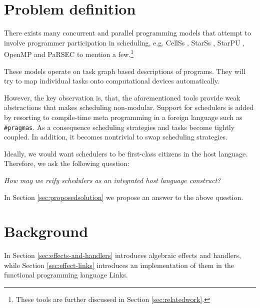 \documentclass[preprint,10pt,numbers]{sigplanconf}
\begin{document}

  \section{Problem definition}\label{sec:problemdefinition}
There exists many concurrent and parallel programming models that attempt to involve programmer participation in scheduling, e.g. CellSs \cite{Bellens2009}, StarSs \cite{Planas2009}, StarPU \cite{Augonnet2011}, OpenMP \cite{Openmp2013} and PaRSEC \cite{Bosilca2013} to mention a few.\footnote{These tools are further discussed in Section \ref{sec:relatedwork}.}

These models operate on task graph based descriptions of programs. They will try to map individual tasks onto computational devices automatically.

However, the key observation is, that, the aforementioned tools provide weak abstractions that makes scheduling non-modular. Support for schedulers is added by resorting to compile-time meta programming in a foreign language such as \texttt{\#pragmas}. As a consequence scheduling strategies and tasks become tightly coupled. In addition, it becomes nontrivial to swap scheduling strategies.

Ideally, we would want schedulers to be first-class citizens in the host language. Therefore, we ask the following question:
\begin{center}
  \emph{How may we reify schedulers as an integrated host language construct?}
\end{center}
In Section \ref{sec:proposedsolution} we propose an answer to the above question.

\section{Background}\label{sec:background}
In Section \ref{sec:effects-and-handlers} introduces algebraic effects and handlers, while Section \ref{sec:effect-links} introduces an implementation of them in the functional programming language Links.
\end{document}
